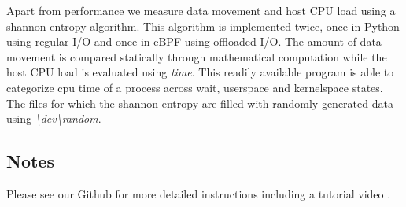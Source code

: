 Apart from performance we measure data movement and host CPU load using a
shannon entropy algorithm. This algorithm is implemented twice, once in Python
using regular I/O and once in eBPF using offloaded I/O. The amount of data
movement is compared statically through mathematical computation while the host
CPU load is evaluated using \textit{time}. This readily available program is
able to categorize cpu time of a process across wait, userspace and kernelspace
states. The files for which the shannon entropy are filled with randomly
generated data using \textit{\textbackslash dev\textbackslash random}.

\subsection{Notes}

Please see our Github for more detailed instructions including a tutorial
video \cite{qemu-csd}.


